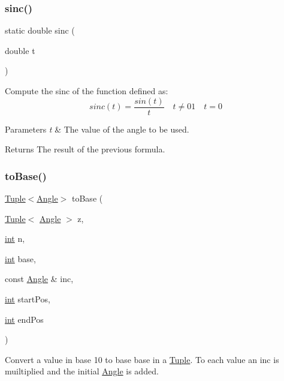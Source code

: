 \subsubsection{\texorpdfstring{sinc()}{sinc()}}
{\footnotesize\ttfamily static double sinc (\begin{DoxyParamCaption}\item[{double}]{t }\end{DoxyParamCaption})\hspace{0.3cm}{\ttfamily [static]}}

Compute the sinc of the function defined as\+: \[ sinc(t)=\frac{sin(t)}{t}\quad t\neq 0 1\quad t=0 \] 
\begin{DoxyParams}{Parameters}
{\em t} & The value of the angle to be used. \\
\hline
\end{DoxyParams}
\begin{DoxyReturn}{Returns}
The result of the previous formula. 
\end{DoxyReturn}
\mbox{\label{dubins_8hh_a24a357b93081a0180dfec16136bc8ff7}} 
\subsubsection{\texorpdfstring{toBase()}{toBase()}}
{\footnotesize\ttfamily \mbox{\hyperlink{class_tuple}{Tuple}}$<$\mbox{\hyperlink{class_angle}{Angle}}$>$ to\+Base (\begin{DoxyParamCaption}\item[{\mbox{\hyperlink{class_tuple}{Tuple}}$<$ \mbox{\hyperlink{class_angle}{Angle}} $>$}]{z,  }\item[{\mbox{\hyperlink{draw_8hh_aa620a13339ac3a1177c86edc549fda9b}{int}}}]{n,  }\item[{\mbox{\hyperlink{draw_8hh_aa620a13339ac3a1177c86edc549fda9b}{int}}}]{base,  }\item[{const \mbox{\hyperlink{class_angle}{Angle}} \&}]{inc,  }\item[{\mbox{\hyperlink{draw_8hh_aa620a13339ac3a1177c86edc549fda9b}{int}}}]{start\+Pos,  }\item[{\mbox{\hyperlink{draw_8hh_aa620a13339ac3a1177c86edc549fda9b}{int}}}]{end\+Pos }\end{DoxyParamCaption})}



Convert a value in base 10 to base {\ttfamily base} in a {\ttfamily \mbox{\hyperlink{class_tuple}{Tuple}}}. To each value an inc is muiltiplied and the initial {\ttfamily \mbox{\hyperlink{class_angle}{Angle}}} is added. 


